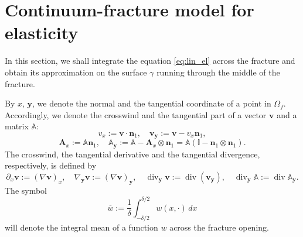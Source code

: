 \documentclass[a4paper]{article}
\def\prtl{\partial}
\def\vc#1{\mathbf{\boldsymbol{#1}}}     %
\def\tn#1{{\mathbb{#1}}}    %
\def\div{\operatorname{div}}
\def\nn{\vc n}
\def\tr{\operatorname{tr}}
\def\vv{\vc v}
\def\yy{{\vc y}}
\begin{document}
\section{Continuum-fracture model for elasticity}
\label{sc:ad_on_fractures}

In this section, we shall integrate the equation \eqref{eq:lin_el} across the fracture and obtain its approximation on the surface $\gamma$ running through the middle of the fracture.

By $x$, $\vc y$, we denote the normal and the tangential coordinate of a point in $\Omega_f$.
Accordingly, we denote the crosswind and the tangential part of a vector $\vv$ and a matrix $\tn A$:
\[ v_x := \vv\cdot\nn_1, \quad \vv_\yy := \vv-v_x\nn_1, \]
\[ \vc A_x := \tn A\nn_1, \quad \tn A_\yy := \tn A-\vc A_x\otimes\nn_1 = \tn A(\tn I-\nn_1\otimes\nn_1). \]
The crosswind, the tangential derivative and the tangential divergence, respectively, is defined by
\[ \prtl_x\vv := (\nabla\vv)_x,\quad \nabla_\yy\vv := (\nabla\vv)_\yy,\quad \div_\yy\vv:=\div(\vv_\yy),\quad \div_\yy\tn A:=\div\tn A_\yy. \]
The symbol
\[ \overline w:=\frac1\delta\int_{-\delta/2}^{\delta/2} w(x,\cdot)\,dx \]
will denote the integral mean of a function $w$ across the fracture opening.
\end{document}
